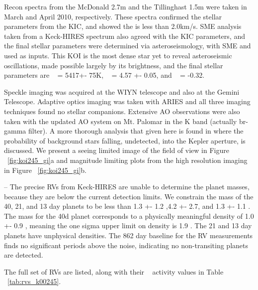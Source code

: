 \documentclass{emulateapj}
\begin{document}
Recon spectra from the McDonald 2.7m and the Tillinghast 1.5m were taken in March and April 2010, respectively. These spectra confirmed the stellar parameters from the KIC, and showed the \vsini is less than 2.0km/s. SME analysis taken from a Keck-HIRES spectrum also agreed with the KIC parameters, and  the final stellar parameters were determined via asteroseismology, with SME \teff and \logg used as inputs. This KOI is the most dense star yet to reveal asteroseismic oscillations, made possible largely by its brightness, and the final stellar parameters are \teff~ = 5417+- 75K, \logg~ = 4.57 +- 0.05, and \feh~ = -0.32.

 Speckle imaging was acquired at the WIYN telescope and also at the Gemini Telescope. Adaptive optics imaging was taken with ARIES and all three imaging techniques found no stellar companions. Extensive AO observations were also taken with the updated AO system on Mt. Palomar in the K band (actually br-gamma filter). A more thorough analysis that given here is found in  \citep{Barclay2013} where the probability of background stars falling, undetected, into the Kepler aperture, is discussed. We present a seeing limited image of the field of view in Figure ~\ref{fig:koi245_gi}a and magnitude limiting plots from the high resolution imaging in Figure ~\ref{fig:koi245_gi}b.
 
 --
 The precise RVs from Keck-HIRES are unable to determine the planet masses, because they are below the current detection limits. We constrain the mass of the 40, 21, and 13 day planets to be less than 1.3 +- 1.2 ,4.2 +- 2.7, and 1.3 +- 1.1 \mearthe. The mass for the 40d planet corresponds to a physically meaningful density of 1.0 +- 0.9 \gcc, meaning the one sigma upper limit on density is 1.9 \gcc. The 21 and 13 day planets have unphysical densities. The 862 day baseline for the RV measurements finds no significant periods above the noise, indicating no non-transiting planets are detected.
 
The full set of RVs are listed, along with their \rphk~ activity values in Table ~\ref{tab:rvs_k00245}.



\subsection{\koitwofoursix}   %
\end{document}

